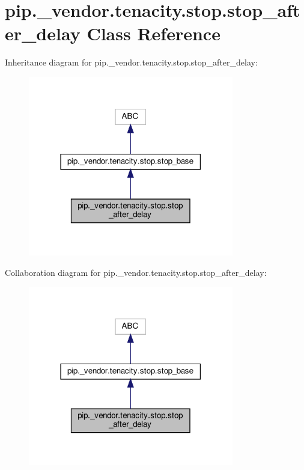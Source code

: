 \hypertarget{classpip_1_1__vendor_1_1tenacity_1_1stop_1_1stop__after__delay}{}\section{pip.\+\_\+vendor.\+tenacity.\+stop.\+stop\+\_\+after\+\_\+delay Class Reference}
\label{classpip_1_1__vendor_1_1tenacity_1_1stop_1_1stop__after__delay}


Inheritance diagram for pip.\+\_\+vendor.\+tenacity.\+stop.\+stop\+\_\+after\+\_\+delay\+:
\nopagebreak
\begin{figure}[H]
\begin{center}
\leavevmode
\includegraphics[width=254pt]{classpip_1_1__vendor_1_1tenacity_1_1stop_1_1stop__after__delay__inherit__graph}
\end{center}
\end{figure}


Collaboration diagram for pip.\+\_\+vendor.\+tenacity.\+stop.\+stop\+\_\+after\+\_\+delay\+:
\nopagebreak
\begin{figure}[H]
\begin{center}
\leavevmode
\includegraphics[width=254pt]{classpip_1_1__vendor_1_1tenacity_1_1stop_1_1stop__after__delay__coll__graph}
\end{center}
\end{figure}

